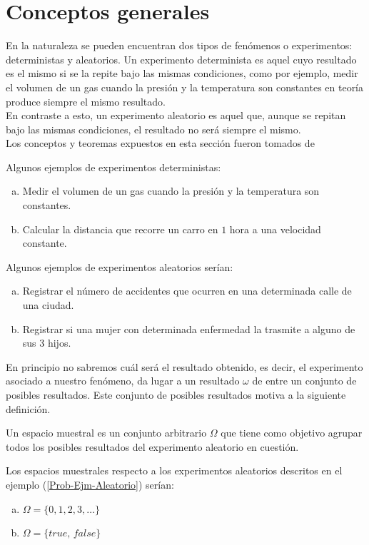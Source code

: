 \section{Conceptos generales}
    En la naturaleza se pueden encuentran dos tipos de fenómenos o experimentos: deterministas y aleatorios. Un experimento determinista es aquel cuyo resultado es el mismo si se la repite bajo las mismas condiciones, como por ejemplo, medir el volumen de un gas cuando la presión y la temperatura son constantes en teoría produce siempre el mismo resultado.\\
    En contraste a esto, un experimento aleatorio es aquel que, aunque se repitan bajo las mismas condiciones, el resultado no será siempre el mismo.\\
    Los conceptos y teoremas expuestos en esta sección fueron tomados de \cite{Rincon1} \cite{Rincon2}
\begin{Ejm}
    Algunos ejemplos de experimentos deterministas:
    \begin{enumerate}[a)]
        \item Medir el volumen de un gas cuando la presión y la temperatura son constantes.
        \item Calcular la distancia que recorre un carro en $1$ hora a una velocidad constante.
    \end{enumerate}
\end{Ejm}
\begin{Ejm}
\label{Prob-Ejm-Aleatorio}
Algunos ejemplos de experimentos aleatorios serían:
    \begin{enumerate}[a)]
        \item Registrar el número de accidentes que ocurren en una determinada calle de una ciudad.
        \item Registrar si una mujer con  determinada enfermedad la trasmite a alguno de sus 3 hijos.
    \end{enumerate}
\end{Ejm}
En principio no sabremos cuál será el resultado obtenido, es decir, el experimento asociado a nuestro fenómeno, da lugar a un resultado $\omega$ de entre un conjunto de posibles resultados. Este conjunto de posibles resultados motiva a la siguiente definición.
\begin{Def}
Un espacio muestral es un conjunto arbitrario $\Omega$ que tiene como objetivo agrupar todos los posibles resultados del experimento aleatorio en cuestión.
\end{Def}
\begin{Ejm}
Los espacios muestrales respecto a los experimentos aleatorios descritos en el ejemplo (\ref{Prob-Ejm-Aleatorio}) serían:
\begin{enumerate}[a)]
    \item $\Omega=\{0,1,2,3,\ldots\}$
    \item $\Omega=\{\textit{true, false}\}$
\end{enumerate}
\end{Ejm}
